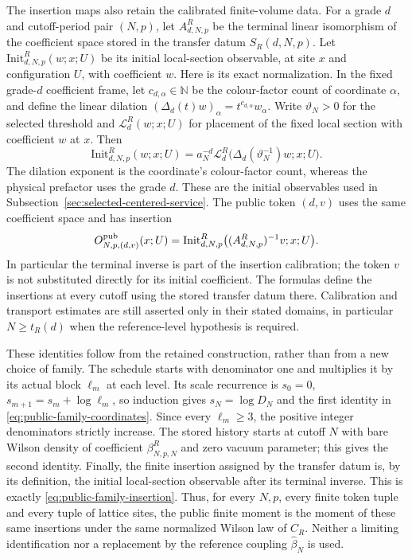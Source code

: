 The insertion maps also retain the calibrated finite-volume data.
For a grade $d$ and cutoff-period pair $(N,p)$, let
$A^R_{d,N,p}$ be the terminal linear isomorphism of the coefficient space
stored in the transfer datum $S_R(d,N,p)$. Let
$\mathrm{Init}^R_{d,N,p}(w;x;U)$ be its initial local-section observable,
at site $x$ and configuration $U$, with coefficient $w$.
Here is its exact normalization. In the fixed grade-$d$ coefficient frame,
let $c_{d,\alpha}\in\mathbb N$ be the colour-factor count of coordinate
$\alpha$, and define the linear dilation
$(\Delta_d(t)w)_\alpha=t^{c_{d,\alpha}}w_\alpha$.
Write $\vartheta_N>0$ for the selected threshold and
$\mathcal L^R_d(w;x;U)$ for placement of the fixed local section with
coefficient $w$ at $x$. Then
\[
 \mathrm{Init}^R_{d,N,p}(w;x;U)
 =a_N^{-d}\mathcal L^R_d\bigl(\Delta_d(\vartheta_N^{-1})w;x;U\bigr).
\]
The dilation exponent is the coordinate's colour-factor count, whereas
the physical prefactor uses the grade $d$. These are the initial
observables used in Subsection~\ref{sec:selected-centered-service}.
The public token $(d,v)$ uses the same coefficient space and has insertion
\begin{equation}\label{eq:public-family-insertion}
 O^{\rm pub}_{N,p,(d,v)}(x;U)
 =\mathrm{Init}^R_{d,N,p}\bigl((A^R_{d,N,p})^{-1}v;x;U\bigr).
\end{equation}
In particular the terminal inverse is part of the insertion calibration;
the token $v$ is not substituted directly for its initial coefficient.
The formulas define the insertions at every cutoff using the stored
transfer datum there. Calibration and transport estimates are still
asserted only in their stated domains, in particular $N\ge t_R(d)$
when the reference-level hypothesis is required.

These identities follow from the retained construction, rather than
from a new choice of family. The schedule starts with denominator one
and multiplies it by its actual block $\ell_m$ at each level. Its scale
recurrence is $s_0=0$, $s_{m+1}=s_m+\log\ell_m$, so induction gives
$s_N=\log D_N$ and the first identity in
\eqref{eq:public-family-coordinates}. Since every $\ell_m\ge3$, the
positive integer denominators strictly increase. The stored history
starts at cutoff $N$ with bare Wilson density of coefficient
$\beta^R_{N,p,N}$ and zero vacuum parameter; this gives the second
identity. Finally, the finite insertion assigned by the transfer datum
is, by its definition, the initial local-section observable after its
terminal inverse. This is exactly \eqref{eq:public-family-insertion}.
Thus, for every $N,p$, every finite token tuple and every tuple of lattice
sites, the public finite moment is the moment of these same insertions
under the same normalized Wilson law of $C_R$. Neither a limiting
identification nor a replacement by the reference coupling
$\widehat\beta_N$ is used.

